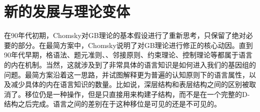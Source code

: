 \section{新的发展与理论变体}
\label{Abschnitt-neues-GB}

在90年代初期，Chomsky对GB理论的基本假设进行了重新思考，只保留了绝对必要的部分。在最简方案中，Chomsky说明了对GB理论进行修正的核心动因\citep{Chomsky93b-u,Chomsky95a-u}。直到90年代早期，格语法、题元准则、\xbartc、邻接原则、约束理论、控制理论等都属于语言的内在机制\citep[]{Richards2015a}。当然，这就涉及到了非常具体的语言知识是如何进入我们的基因组的问题。最简方案沿着这一思路，并试图解释更为普遍的认知原则下的语言属性，以及减少具体的内在语言知识的数量。比如说，深层结构和表层结构之间的区别被取消了。移位仍是一种操作，但是只直接用来构建子结构，而不是在一个完整的D-结构之后完成。语言之间的差别在于这种移位是可见的还是不可见的。

